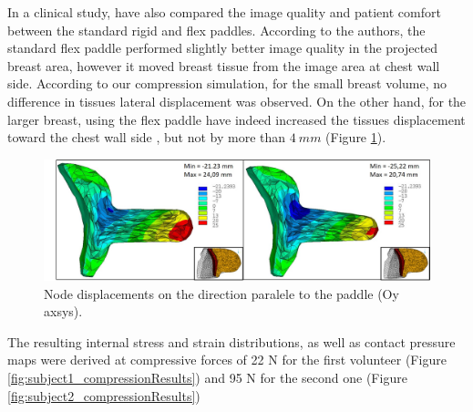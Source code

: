 In a clinical study, \cite{broeders_comparison_2015} have also compared the image quality and patient comfort between the standard rigid and flex paddles. According to the authors, the standard flex paddle performed slightly better image quality in the projected breast area, however it moved breast tissue from the image area at chest wall side. According to our compression simulation, for the small breast volume, no difference in tissues lateral displacement was observed. On the other hand, for the larger breast, using the flex paddle have indeed increased the tissues displacement toward the chest wall side , but not by more than $4 \ mm$ (Figure \ref{fig:rigid_flex_y_displacement}).  

\begin{figure}[!h]
\centering
\includegraphics[width=1\textwidth,keepaspectratio]{figures/rigid_flex_y_displacement.jpg} 
\caption{Node displacements on the direction paralele to the paddle (Oy axsys).}\label{fig:rigid_flex_y_displacement}
\end{figure}

The resulting internal stress and strain distributions, as well as contact pressure maps were derived at compressive forces of 22 N for the first volunteer (Figure \ref{fig:subject1_compressionResults}) and 95 N for the second one (Figure \ref{fig:subject2_compressionResults})

